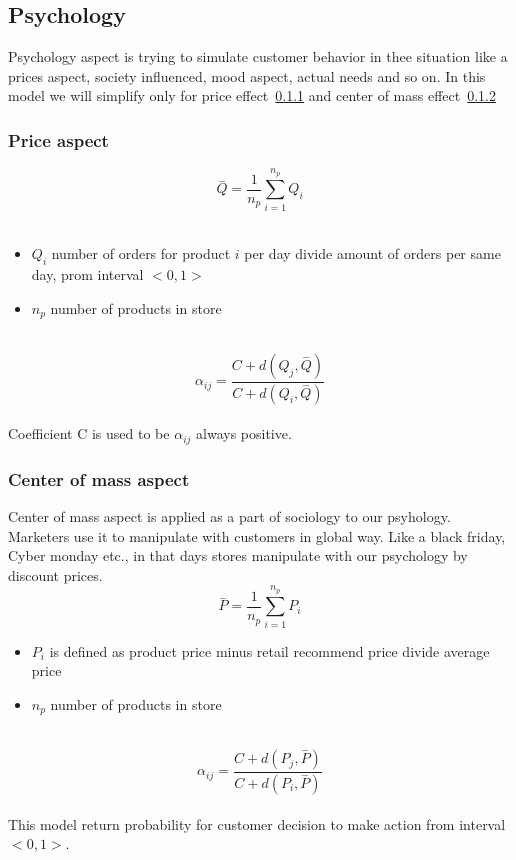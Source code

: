 \subsection{Psychology} \label{subsec:model_psychology}
Psychology aspect is trying to simulate customer behavior in thee situation like a prices aspect, society influenced, mood aspect, actual needs
and so on.
In this model we will simplify only for price effect~\ref{subsubsec:model_psychology_price} and center of mass effect~\ref{subsubsec:model_psychology_mass}
\subsubsection{Price aspect} \label{subsubsec:model_psychology_price}
\begin{equation} \label{eq:26}
\overset{-}{Q} = \frac{1}{n_p} \sum_{i=1}^{n_p} Q_i
\end{equation}
\\
\begin{itemize}
    \item $Q_i$ number of orders for product $i$ per day divide amount of orders per same day, prom interval $<0,1>$
    \item $n_p$ number of products in store
\end{itemize}
\\
\begin{equation} \label{eq:27}
\alpha_{ij} = \frac{C+d(Q_j, \overset{-}{Q})}{C+d(Q_i, \overset{-}{Q})}
\end{equation}
\\
Coefficient C is used to be $\alpha_{ij}$ always positive.
\subsubsection{Center of mass aspect} \label{subsubsec:model_psychology_mass}
Center of mass aspect is applied as a part of sociology to our psyhology.
Marketers use it to manipulate with customers in global way.
Like a black friday, Cyber monday etc., in that days stores manipulate with our psychology by discount prices.
\\
\begin{equation} \label{eq:28}
\overset{-}{P} = \frac{1}{n_p} \sum_{i=1}^{n_p} P_i
\end{equation}
\begin{itemize}
    \item $P_i$ is defined as product price minus retail recommend price divide average price
    \item $n_p$ number of products in store
\end{itemize}
\\
\begin{equation} \label{eq:29}
\alpha_{ij} = \frac{C+d(P_j, \overset{-}{P})}{C+d(P_i, \overset{-}{P})}
\end{equation}
\\
This model return probability for customer decision to make action from interval $<0,1>$.
\\
